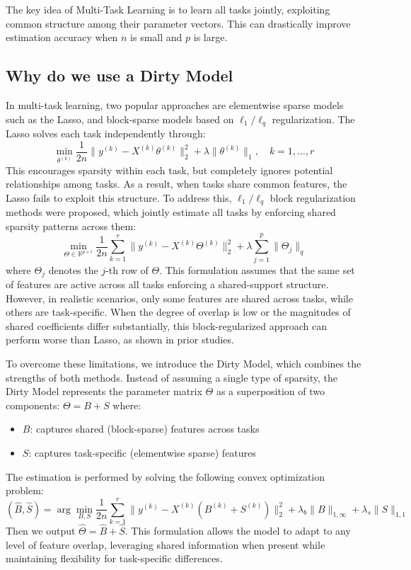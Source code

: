 \documentclass{article}
\begin{document}
The key idea of Multi-Task Learning is to learn all tasks jointly, exploiting common structure among their parameter vectors.
This can drastically improve estimation accuracy when $n$ is small and $p$ is large.

\subsection{Why do we use a Dirty Model}
In multi-task learning, two popular approaches are elementwise sparse models such as the Lasso, and block-sparse models based on $\ell_1/\ell_q$ regularization.
The Lasso solves each task independently through:
\begin{equation}
\min_{\theta^{(k)}} \frac{1}{2n}\|y^{(k)} - X^{(k)}\theta^{(k)}\|_2^2 + \lambda \|\theta^{(k)}\|_1, \quad k = 1, \dots, r
\end{equation}
This encourages sparsity within each task, but completely ignores potential relationships among tasks.
As a result, when tasks share common features, the Lasso fails to exploit this structure.
To address this, $\ell_1/\ell_q$ block regularization methods were proposed, which jointly estimate all tasks by enforcing shared sparsity patterns across them:
\begin{equation}
\min_{\Theta \in \mathbb{R}^{p \times r}} \frac{1}{2n}\sum_{k=1}^r \|y^{(k)} - X^{(k)}\Theta^{(k)}\|_2^2 + \lambda \sum_{j=1}^p \|\Theta_{j}\|_q
\end{equation}
where $\Theta_j$ denotes the $j$-th row of $\Theta$.
This formulation assumes that the same set of features are active across all tasks enforcing a shared-support structure. However, in realistic scenarios, only some features are shared across tasks, while others are task-specific.
When the degree of overlap is low or the magnitudes of shared coefficients differ substantially, this block-regularized approach can perform worse than Lasso, as shown in prior studies.

To overcome these limitations, we introduce the Dirty Model, which combines the strengths of both methods.
Instead of assuming a single type of sparsity, the Dirty Model represents the parameter matrix $\Theta$ as a superposition of two components:
$\Theta = B + S$
where:
\begin{itemize}
    \item $B$: captures shared (block-sparse) features across tasks
    \item $S$: captures task-specific (elementwise sparse) features
\end{itemize}
The estimation is performed by solving the following convex optimization problem:
\begin{equation} \label{eq:algorithm}
(\widehat{B}, \widehat{S}) =
\arg\min_{B,S}
\frac{1}{2n}\sum_{k=1}^{r} \|y^{(k)} - X^{(k)}(B^{(k)} + S^{(k)})\|_2^2 + \lambda_b \|B\|_{1,\infty} + \lambda_s \|S\|_{1,1}
\end{equation}
Then we output $\widehat\Theta = \widehat B + \widehat S$.
This formulation allows the model to adapt to any level of feature overlap, leveraging shared information when present while maintaining flexibility for task-specific differences.
\end{document}
